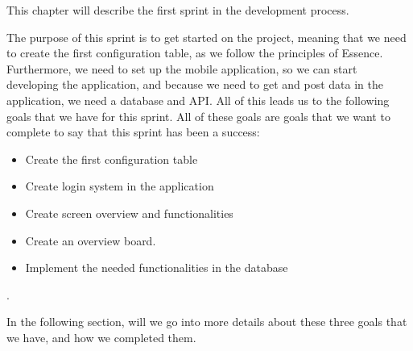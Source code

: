 This chapter will describe the first sprint in the development process.

The purpose of this sprint is to get started on the project, meaning that we need to create the first configuration table, as we follow the principles of Essence.
Furthermore, we need to set up the mobile application, so we can start developing the application, and because we need to get and post data in the application, we need a database and API.
All of this leads us to the following goals that we have for this sprint.
All of these goals are goals that we want to complete to say that this sprint has been a success:

\begin{itemize}
    \item Create the first configuration table 
    \item Create login system in the application
    \item Create screen overview and functionalities
    \item Create an overview board.
    \item Implement the needed functionalities in the database
\end{itemize}.

In the following section, will we go into more details about these three goals that we have, and how we completed them.
